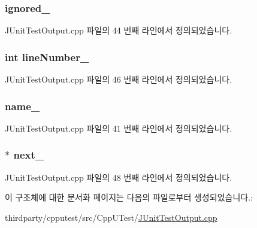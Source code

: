 \subsubsection[{\texorpdfstring{ignored\+\_\+}{ignored_}}]{ ignored\+\_\+}\hypertarget{struct_j_unit_test_case_result_node_a080bf1251153ebc55b9b430fd869e147}{}\label{struct_j_unit_test_case_result_node_a080bf1251153ebc55b9b430fd869e147}


J\+Unit\+Test\+Output.\+cpp 파일의 44 번째 라인에서 정의되었습니다.

\subsubsection[{\texorpdfstring{line\+Number\+\_\+}{lineNumber_}}]{\setlength{\rightskip}{0pt plus 5cm}int line\+Number\+\_\+}\hypertarget{struct_j_unit_test_case_result_node_ab83f5a7389dae9b8045aa6fbf55b153a}{}\label{struct_j_unit_test_case_result_node_ab83f5a7389dae9b8045aa6fbf55b153a}


J\+Unit\+Test\+Output.\+cpp 파일의 46 번째 라인에서 정의되었습니다.

\subsubsection[{\texorpdfstring{name\+\_\+}{name_}}]{ name\+\_\+}\hypertarget{struct_j_unit_test_case_result_node_aac73c86e1e892f392d1fc423e25f51a8}{}\label{struct_j_unit_test_case_result_node_aac73c86e1e892f392d1fc423e25f51a8}


J\+Unit\+Test\+Output.\+cpp 파일의 41 번째 라인에서 정의되었습니다.

\subsubsection[{\texorpdfstring{next\+\_\+}{next_}}]{$\ast$ next\+\_\+}\hypertarget{struct_j_unit_test_case_result_node_a071cdad5d255e499920e0f7fb745f94a}{}\label{struct_j_unit_test_case_result_node_a071cdad5d255e499920e0f7fb745f94a}


J\+Unit\+Test\+Output.\+cpp 파일의 48 번째 라인에서 정의되었습니다.



이 구조체에 대한 문서화 페이지는 다음의 파일로부터 생성되었습니다.\+:\begin{DoxyCompactItemize}
\item 
thirdparty/cpputest/src/\+Cpp\+U\+Test/\hyperlink{_j_unit_test_output_8cpp}{J\+Unit\+Test\+Output.\+cpp}\end{DoxyCompactItemize}
